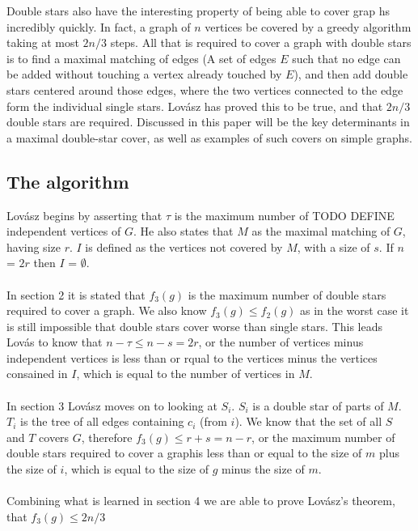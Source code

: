 \documentclass{article}
\begin{document}
	Double stars also have the interesting property of being able to cover grap hs incredibly quickly. In fact, a graph of $n$ vertices be covered by a greedy algorithm taking at most $2n/3$ steps. All that is required to cover a graph with double stars is to find a maximal matching of edges (A set of edges $E$ such that no edge can be added without touching a vertex already touched by $E$), and then add double stars centered around those edges, where the two vertices connected to the edge form the individual single stars. Lov\'asz has proved this to be true, and that $2n/3$ double stars are required. Discussed in this paper will be the key determinants in a maximal double-star cover, as well as examples of such covers on simple graphs.
	\subsection{The algorithm}
	
	Lov\'asz begins by asserting that $\tau$ is the maximum number of TODO DEFINE independent vertices of $G$. He also states that $M$ as the maximal matching of $G$, having size $r$. $I$ is defined as the vertices not covered by $M$, with a size of $s$. If $n$ = $2r$ then $I$ = $\emptyset$.
	\\\\
	In section 2 it is stated that $f_{3}(g)$ is the maximum number of double stars required to cover a graph. We also know $f_{3}(g) \leq f_{2}(g)$ as in the worst case it is still impossible that double stars cover worse than single stars. This leads Lov\'as to know that $n-\tau \leq n-s = 2r$, or the number of vertices minus independent vertices is less than or rqual to the vertices minus the vertices consained in $I$, which is equal to the number of vertices in $M$.
	\\\\
	In section 3 Lov\'asz moves on to looking at $S_{i}$. $S_{i}$ is a double star of parts of $M$. $T_{i}$ is the tree of all edges containing $c_{i}$ (from $i$). We know that the set of all $S$ and $T$ covers $G$, therefore $f_{3}(g) \leq r + s = n - r$, or the maximum number of double stars required to cover a graphis less than or equal to the size of $m$ plus the size of $i$, which is equal to the size of $g$ minus the size of $m$.
	\\\\
	Combining what is learned in section 4 we are able to prove Lov\'asz's theorem, that $f_{3}(g) \leq 2n/3$
	
\end{document}
